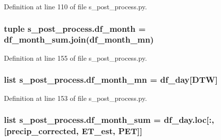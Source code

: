 Definition at line 110 of file s\+\_\+post\+\_\+process.\+py.

\hypertarget{namespaces__post__process_ad04d032c16dc19da104e670a42d44369}{}
\subsubsection[{df\+\_\+month}]{\setlength{\rightskip}{0pt plus 5cm}tuple s\+\_\+post\+\_\+process.\+df\+\_\+month = df\+\_\+month\+\_\+sum.\+join({\bf df\+\_\+month\+\_\+mn})}\label{namespaces__post__process_ad04d032c16dc19da104e670a42d44369}


Definition at line 155 of file s\+\_\+post\+\_\+process.\+py.

\hypertarget{namespaces__post__process_a3b843457bef429e8fb9f85dfc5cc9640}{}
\subsubsection[{df\+\_\+month\+\_\+mn}]{\setlength{\rightskip}{0pt plus 5cm}list s\+\_\+post\+\_\+process.\+df\+\_\+month\+\_\+mn = {\bf df\+\_\+day}\mbox{[}\textquotesingle{}D\+T\+W\textquotesingle{}\mbox{]}}\label{namespaces__post__process_a3b843457bef429e8fb9f85dfc5cc9640}


Definition at line 153 of file s\+\_\+post\+\_\+process.\+py.

\hypertarget{namespaces__post__process_a25a3476877b3efdf225f84a94fa05130}{}
\subsubsection[{df\+\_\+month\+\_\+sum}]{\setlength{\rightskip}{0pt plus 5cm}list s\+\_\+post\+\_\+process.\+df\+\_\+month\+\_\+sum = df\+\_\+day.\+loc\mbox{[}\+:, \mbox{[}\textquotesingle{}precip\+\_\+corrected\textquotesingle{}, \textquotesingle{}E\+T\+\_\+est\textquotesingle{}, \textquotesingle{}P\+E\+T\textquotesingle{}\mbox{]}\mbox{]}}\label{namespaces__post__process_a25a3476877b3efdf225f84a94fa05130}


